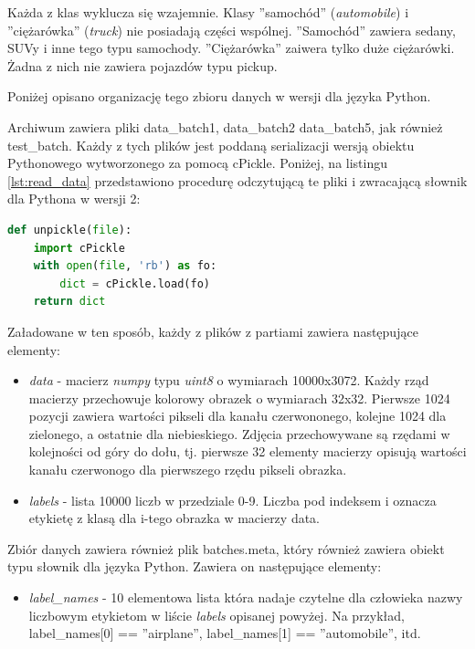 Każda z klas wyklucza się wzajemnie. Klasy ''samochód'' (\textit{automobile}) i ''ciężarówka'' (\textit{truck}) nie posiadają części wspólnej. ''Samochód'' zawiera sedany, SUVy i inne tego typu samochody. ''Ciężarówka'' zaiwera tylko duże ciężarówki. Żadna z nich nie zawiera pojazdów typu pickup.

Poniżej opisano organizację tego zbioru danych w wersji dla języka Python.

Archiwum zawiera pliki data\_batch1, data\_batch2 data\_batch5, jak również test\_batch. Każdy z tych plików jest poddaną serializacji wersją obiektu Pythonowego wytworzonego za pomocą cPickle. Poniżej, na listingu \ref{lst:read_data} przedstawiono procedurę odczytującą te pliki i zwracającą słownik dla Pythona w wersji 2:

\begin{lstlisting}[caption={Procedura ładowania zbioru danych},label={lst:read_data},language=Python,captionpos=b,frame=single]
def unpickle(file):
    import cPickle
    with open(file, 'rb') as fo:
        dict = cPickle.load(fo)
    return dict
\end{lstlisting}

    Załadowane w ten sposób, każdy z plików z partiami zawiera następujące elementy:
\begin{itemize}
\item \textit{data} - macierz \textit{numpy} typu \textit{uint8} o wymiarach 10000x3072. Każdy rząd macierzy przechowuje kolorowy obrazek o wymiarach 32x32. Pierwsze 1024 pozycji zawiera wartości pikseli dla kanału czerwononego, kolejne 1024 dla zielonego, a ostatnie dla niebieskiego. Zdjęcia przechowywane są rzędami w kolejności od góry do dołu, tj. pierwsze 32 elementy macierzy opisują wartości kanału czerwonogo dla pierwszego rzędu pikseli obrazka.
\item \textit{labels} - lista 10000 liczb w przedziale 0-9. Liczba pod indeksem i oznacza etykietę z klasą dla i-tego obrazka w macierzy data.
\end{itemize}

Zbiór danych zawiera również plik batches.meta, który również zawiera obiekt typu słownik dla języka Python. Zawiera on następujące elementy:
\begin{itemize}
\item \textit{label\_names} - 10 elementowa lista która nadaje czytelne dla człowieka nazwy liczbowym etykietom w liście \textit{labels} opisanej powyżej. Na przykład, label\_names[0] == ''airplane'', label\_names[1] == ''automobile'', itd. \cite{Krizhevsky09learningmultiple}
\end{itemize}

